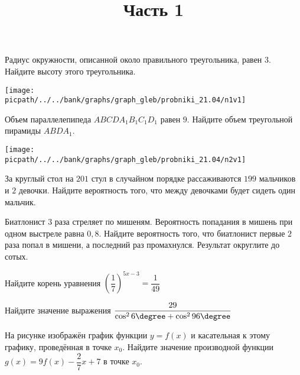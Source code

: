%
%

\begin{training}[1]
	\title{Часть 1}
	\egepreambone
	\begin{listofex}
		\item
		\begin{minipage}[t]{\bodywidth}
			Радиус окружности, описанной около правильного треугольника, равен \( 3 \). Найдите высоту этого треугольника.
			\foranswer
		\end{minipage}
		\gapwidth
		\begin{minipage}[t]{\picwidth}
			\texttt{[image: \\picpath/../../bank/graphs/graph\_gleb/probniki\_21.04/n1v1]}
		\end{minipage}
		\item
		\begin{minipage}[t]{\bodywidth}
			Объем параллелепипеда \( ABCDA_1B_1C_1D_1 \) равен \( 9 \). Найдите объем треугольной пирамиды \( ABDA_1 \).
			\foranswer
		\end{minipage}
		\gapwidth
		\begin{minipage}[t]{\picwidth}
			\texttt{[image: \\picpath/../../bank/graphs/graph\_gleb/probniki\_21.04/n2v1]}
		\end{minipage}
			\item За круглый стол на \( 201 \) стул в случайном порядке рассаживаются \( 199 \) мальчиков и \( 2 \) девочки. Найдите вероятность того, что между девочками будет сидеть один мальчик.
		\foranswer
		\item Биатлонист \( 3 \) раза стреляет по мишеням. Вероятность попадания в мишень при одном выстреле равна \( 0,8 \). Найдите вероятность того, что биатлонист первые \( 2 \) раза попал в мишени, а последний раз промахнулся. Результат округлите до сотых.
		\foranswer
	\end{listofex}
	\newpage
	\phantom{Часть 1}
	\begin{listofex}[resume]
		\item Найдите корень уравнения \( \left( \dfrac{1}{7} \right)^{5x-3}=\dfrac{1}{49} \)
		\foranswer
		\item Найдите значение выражения \( \dfrac{29}{\cos^26\degree+\cos^296\degree} \)
		\foranswer
		\item
		На рисунке изображён график функции \( y=f(x) \) и касательная к этому графику, проведённая в точке \( x_0 \). Найдите значение производной функции \( g(x)=9f(x)-\dfrac{2}{7}x+7 \) в точке \( x_0 \).

\end{listofex}
\end{training}
